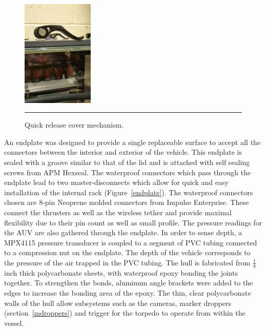 \begin{figure}
\begin{center}
 \includegraphics[width=1.34in]{fig/dsc06462} 
\vspace{.05in}
\hrule
\caption{Quick release cover mechanism.}\label{quick}
\end{center}
\end{figure}

An endplate was designed to provide a single replaceable surface to accept all the connectors between the interior and exterior of the vehicle.  This endplate is sealed with a groove similar to that of the lid and is attached with self sealing screws from APM Hexseal.  The waterproof connectors which pass through the endplate lead to two master-disconnects which allow for quick and easy installation of the internal rack (Figure~\ref{endplate}).
The waterproof connectors chosen are 8-pin Neoprene molded connectors
from Impulse Enterprise.  These connect the thrusters as well as the
wireless tether and provide maximal flexibility due to their pin count
as well as small profile.  
The pressure readings for the AUV are also gathered  through the
endplate. In order to sense depth, a MPX4115 pressure transducer is
coupled to a segment of PVC tubing connected to a compression nut on
the endplate.  The depth of the vehicle corresponds to the pressure of
the air trapped in the PVC tubing.
  The hull is fabricated from
$\frac{1}{8}$ inch thick polycarbonate sheets, with waterproof epoxy bonding
the joints together.  To strengthen the bonds, aluminum angle brackets
were added to the edges to increase the bonding area of the epoxy. The thin, clear polycarbonate walls of the hull allow subsystems such as the cameras, marker droppers (section~\ref{mdroppers}) and trigger for the torpedo to operate from within the vessel.

